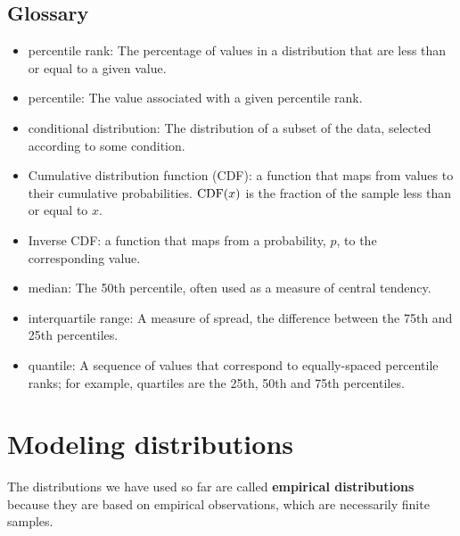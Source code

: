 \documentclass[12pt]{book}
\begin{document}
\section{Glossary}

\begin{itemize}

\item percentile rank: The percentage of values in a distribution that are
less than or equal to a given value.

\item percentile: The value associated with a given percentile rank.

\item conditional distribution: The distribution of a subset of
the data, selected according to some condition.

\item Cumulative distribution function (CDF): a function that maps
  from values to their cumulative probabilities.  $\mathrm{CDF}(x)$ is the
  fraction of the sample less than or equal to $x$.  

\item Inverse CDF: a function that maps from a probability, $p$, to
  the corresponding value.

\item median: The 50th percentile, often used as a measure of central
  tendency.  

\item interquartile range: A measure of spread, the difference between
the 75th and 25th percentiles.

\item quantile: A sequence of values that correspond to equally-spaced
percentile ranks; for example, quartiles are
the 25th, 50th and 75th percentiles.

\end{itemize}


\chapter{Modeling distributions}
\label{analytic}

The distributions we have used so far are called {\bf empirical
  distributions} because they are based on empirical observations,
which are necessarily finite samples.
\end{document}
